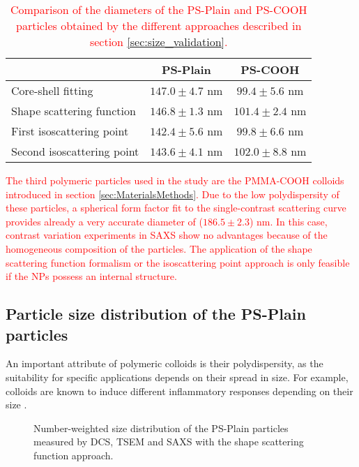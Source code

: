 \begin{table}
\caption[Comparison of the diameters obtained by different evaluation approaches.]{\textcolor{red}{Comparison of the diameters of the PS-Plain and PS-COOH particles obtained by the different approaches described in section \ref{sec:size_validation}.}}
\begin{tabular}{l|cc}
& PS-Plain    &  PS-COOH\\
\hline
Core-shell fitting &  $147.0 \pm 4.7$ nm   &     $99.4 \pm 5.6$ nm     \\
Shape scattering function &  $146.8 \pm 1.3$ nm   &   $101.4 \pm 2.4$ nm \\
First isoscattering point &  $142.4 \pm 5.6$ nm    &     $99.8 \pm 6.6$ nm \\
Second isoscattering point &  $143.6 \pm 4.1$ nm  &   $102.0 \pm 8.8$ nm    \\ \hline
\end{tabular}
\label{tab:comparison_results_polymers}
\end{table}

\textcolor{red}{The third polymeric particles used in the study are the PMMA-COOH colloids introduced in section \ref{sec:MaterialsMethods}. Due to the low polydispersity of these particles, a spherical form factor fit to the single-contrast scattering curve provides already a very accurate diameter of ($186.5\pm2.3$) nm. In this case, contrast variation experiments in SAXS show no advantages because of the homogeneous composition of the particles. The application of the shape scattering function formalism or the isoscattering point approach is only feasible if the NPs possess an internal structure.}

\subsection{Particle size distribution of the PS-Plain particles}
\label{sec:PSPlainSizeDistribution}

An important attribute of polymeric colloids is their polydispersity, as the suitability for specific applications depends on their spread in size. For example, colloids are known to induce different inflammatory responses depending on their size \citep{kusaka_effect_2014}.

\begin{figure}
	\begin{center}
		
	\end{center}
	\caption[Number-weighted size distribution of the PS-Plain particles.]{Number-weighted size distribution of the PS-Plain particles measured by DCS, TSEM \citep{nicolet_inter-laboratory_2016} and SAXS with the shape scattering function approach.}
	\label{fig:PSPlainSizeDistribution}
\end{figure}


